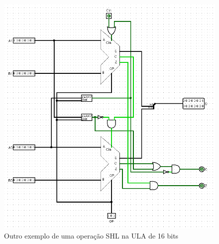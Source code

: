 \documentclass[
	12pt,				%
	openright,			%
	twoside,			%
	a4paper,			%
	english,			%
	french,				%
	spanish,			%
	brazil,				%
	]{abntex2}
\begin{document}
\begin{apendicesenv}
\begin{itemize}
\begin{figure}[p]
	\begin{center}
	    \includegraphics[scale=0.6]{ULA16SHL_2.png}
	\end{center}
\caption{\label{ula16shl2}Outro exemplo de uma operação SHL na ULA de 16 bits}
\end{figure}


\end{itemize}
\end{apendicesenv}
\end{document}
